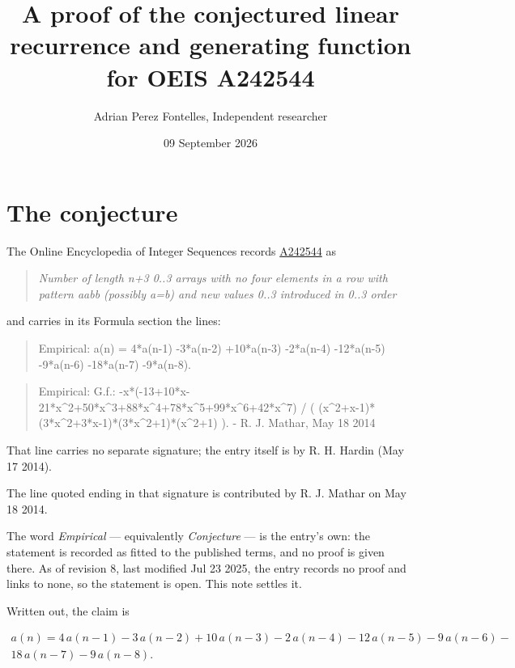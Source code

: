 \documentclass[11pt]{article}
\title{A proof of the conjectured linear recurrence and generating function for OEIS A242544}
\author{Adrian Perez Fontelles, Independent researcher}
\date{09 September 2026}
\theoremstyle{definition}
\begin{document}
\maketitle
\section{The conjecture}

The Online Encyclopedia of Integer Sequences records \href{https://oeis.org/A242544}{A242544} as

\begin{quote}\itshape Number of length n+3 0..3 arrays with no four elements in a row with pattern aabb (possibly a=b) and new values 0..3 introduced in 0..3 order\end{quote}

and carries in its Formula section the lines:

\begin{quote}\ttfamily Empirical: a(n) = 4*a(n-1) -3*a(n-2) +10*a(n-3) -2*a(n-4) -12*a(n-5) -9*a(n-6) -18*a(n-7) -9*a(n-8).\end{quote}

\begin{quote}\ttfamily Empirical: G.f.: -x*(-13+10*x-21*x\textasciicircum{}2+50*x\textasciicircum{}3+88*x\textasciicircum{}4+78*x\textasciicircum{}5+99*x\textasciicircum{}6+42*x\textasciicircum{}7) / ( (x\textasciicircum{}2+x-1)*(3*x\textasciicircum{}2+3*x-1)*(3*x\textasciicircum{}2+1)*(x\textasciicircum{}2+1) ). - R. J. Mathar, May 18 2014\end{quote}

That line carries no separate signature; the entry itself is by R. H. Hardin (May 17 2014).

The line quoted ending in that signature is contributed by R. J. Mathar on May 18 2014.

The word {\itshape Empirical} --- equivalently {\itshape Conjecture} --- is the entry's own: the statement is recorded as fitted to the published terms, and no proof is given there. As of revision 8, last modified Jul 23 2025, the entry records no proof and links to none, so the statement is open. This note settles it.

Written out, the claim is

\begin{multline*} a(n) = 4\,a(n-1) - 3\,a(n-2) + 10\,a(n-3) - 2\,a(n-4) - 12\,a(n-5) - 9\,a(n-6) - \\ 18\,a(n-7) - 9\,a(n-8). \end{multline*}
\end{document}
